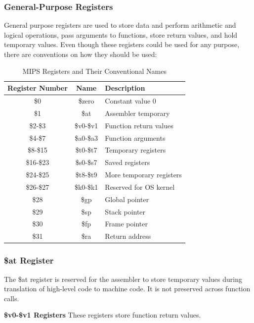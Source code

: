 \subsubsection{General-Purpose Registers}
General purpose registers are used to store data and perform arithmetic and logical operations, pass arguments to functions, store return values, and hold temporary values.
Even though these registers could be used for any purpose, there are conventions on how they should be used:
\begin{table}[h]
    \centering
        \begin{tabular}{|c|c|l|}
        \hline
        \textbf{Register Number} & \textbf{Name} & \textbf{Description} \\ \hline
        \$0 & \$zero & Constant value 0 \\ \hline
        \$1 & \$at & Assembler temporary \\ \hline
        \$2-\$3 & \$v0-\$v1 & Function return values \\ \hline
        \$4-\$7 & \$a0-\$a3 & Function arguments \\ \hline
        \$8-\$15 & \$t0-\$t7 & Temporary registers \\ \hline
        \$16-\$23 & \$s0-\$s7 & Saved registers \\ \hline
        \$24-\$25 & \$t8-\$t9 & More temporary registers \\ \hline
        \$26-\$27 & \$k0-\$k1 & Reserved for OS kernel \\ \hline
        \$28 & \$gp & Global pointer \\ \hline
        \$29 & \$sp & Stack pointer \\ \hline
        \$30 & \$fp & Frame pointer \\ \hline
        \$31 & \$ra & Return address \\ \hline
        \end{tabular}
    \caption{MIPS Registers and Their Conventional Names}
    \label{tab:mips_registers}
\end{table}
\subsubsection{\$at Register}
The \$at register is reserved for the assembler to store temporary values during translation of high-level code to machine code. It is not preserved across function calls.

\textbf{\$v0-\$v1 Registers}\newline
These registers store function return values.

